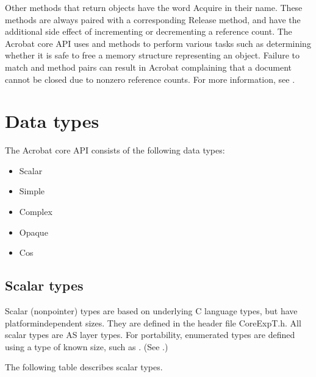 \documentclass[letterpaper,12pt,english,openany,oneside]{sphinxmanual}
\begin{document}
Other methods that return objects have the word Acquire in their name. These methods are always paired with a corresponding Release method, and have the additional side effect of incrementing or decrementing a reference count. The Acrobat core API uses  and  methods to perform various tasks such as determining whether it is safe to free a memory structure representing an object. Failure to match  and  method pairs can result in Acrobat complaining that a document cannot be closed due to non\sphinxhyphen{}zero reference counts. For more information, see .


\section{Data types}
\label{\detokenize{index:data-types}}
The Acrobat core API consists of the following data types:
\begin{itemize}
\item {} 
Scalar

\item {} 
Simple

\item {} 
Complex

\item {} 
Opaque

\item {} 
Cos

\end{itemize}


\subsection{Scalar types}
\label{\detokenize{index:scalar-types}}
Scalar (non\sphinxhyphen{}pointer) types are based on underlying C language types, but have platform\sphinxhyphen{}independent sizes. They are defined in the header file CoreExpT.h. All scalar types are AS layer types. For portability, enumerated types are defined using a type of known size, such as . (See .)

The following table describes scalar types.
\end{document}
